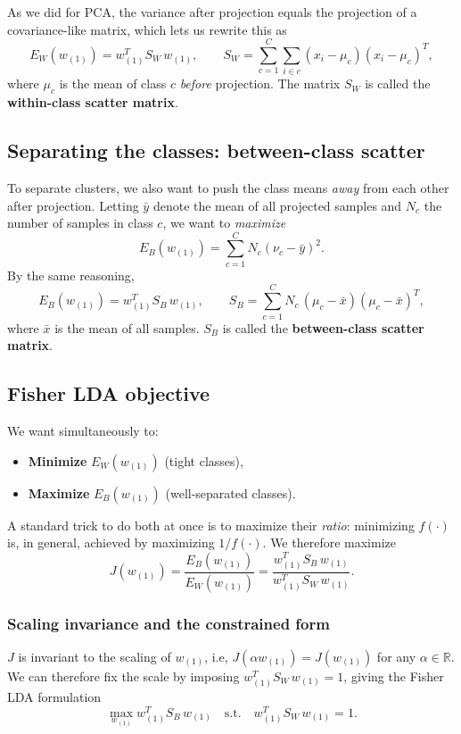 As we did for PCA, the variance after projection equals the projection of a covariance-like
matrix, which lets us rewrite this as
\[
E_W(w_{(1)}) = w_{(1)}^T S_W \, w_{(1)},
\qquad
S_W = \sum_{c=1}^{C} \sum_{i \in c} (x_i - \mu_c)(x_i - \mu_c)^T,
\]
where $\mu_c$ is the mean of class $c$ \emph{before} projection. The matrix $S_W$ is called
the \textbf{within-class scatter matrix}.

\subsection{Separating the classes: between-class scatter}
To separate clusters, we also want to push the class means \emph{away} from each other after
projection. Letting $\bar{y}$ denote the mean of all projected samples and $N_c$ the number
of samples in class $c$, we want to \emph{maximize}
\[
E_B(w_{(1)}) = \sum_{c=1}^{C} N_c (\nu_c - \bar{y})^2.
\]
By the same reasoning,
\[
E_B(w_{(1)}) = w_{(1)}^T S_B \, w_{(1)},
\qquad
S_B = \sum_{c=1}^{C} N_c \,(\mu_c - \bar{x})(\mu_c - \bar{x})^T,
\]
where $\bar{x}$ is the mean of all samples. $S_B$ is called the \textbf{between-class scatter
matrix}.

\subsection{Fisher LDA objective}
We want simultaneously to:
\begin{itemize}
  \item \textbf{Minimize} $E_W(w_{(1)})$ (tight classes),
  \item \textbf{Maximize} $E_B(w_{(1)})$ (well-separated classes).
\end{itemize}
A standard trick to do both at once is to maximize their \emph{ratio}: minimizing $f(\cdot)$
is, in general, achieved by maximizing $1/f(\cdot)$. We therefore maximize
\[
J(w_{(1)}) = \frac{E_B(w_{(1)})}{E_W(w_{(1)})}
           = \frac{w_{(1)}^T S_B \, w_{(1)}}{w_{(1)}^T S_W \, w_{(1)}}.
\]

\subsubsection{Scaling invariance and the constrained form}
$J$ is invariant to the scaling of $w_{(1)}$, i.e, $J(\alpha w_{(1)}) = J(w_{(1)})$ for any
$\alpha \in \mathbb{R}$. We can therefore fix the scale by imposing $w_{(1)}^T S_W \, w_{(1)} = 1$,
giving the Fisher LDA formulation
\[
\max_{w_{(1)}} w_{(1)}^T S_B \, w_{(1)} \quad \text{s.t.} \quad w_{(1)}^T S_W \, w_{(1)} = 1.
\]

